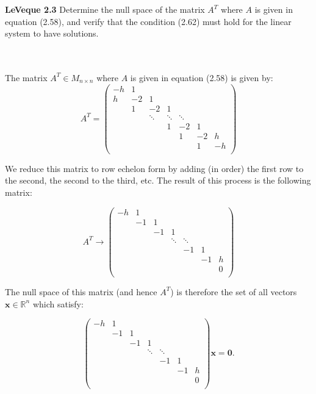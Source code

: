 \textbf{LeVeque 2.3}
Determine the null space of the matrix $A^T$ where $A$ is given in equation (2.58), and verify that the condition (2.62)
must hold for the linear system to have solutions.

\begin{solution}\ \\\\
    The matrix $A^T \in M_{n \times n}$ where $A$ is given in equation (2.58) is given by:
    \[
    A^T = \begin{pmatrix} 
        -h &       1 \\
         h &      -2 & 1 \\
           &       1 & -2 & 1 \\
           &         & \ddots & \ddots & \ddots \\
           &         &        & 1      & -2 & 1 \\
           &         &        &        & 1  & -2 & h \\
           &         &        &        &    & 1  & -h \\
    \end{pmatrix}
    \]

    We reduce this matrix to row echelon form by adding (in order) the first row to the second, the second to the third,
    etc. The result of this process is the following matrix:
    
    \[
    A^T \rightarrow \begin{pmatrix} 
        -h &       1 \\
           &      -1 & 1 \\
           &         & -1     & 1 \\
           &         &        & \ddots & \ddots \\
           &         &        &        & -1 & 1 \\
           &         &        &        &    & -1 & h \\
           &         &        &        &    &    & 0 \\
    \end{pmatrix}
    \]

    The null space of this matrix (and hence $A^T$) is therefore the set of all vectors $\textbf{x} \in \mathbb{R}^n$ 
    which satisfy:

    \[
    \begin{pmatrix} 
        -h &       1 \\
           &      -1 & 1 \\
           &         & -1     & 1 \\
           &         &        & \ddots & \ddots \\
           &         &        &        & -1 & 1 \\
           &         &        &        &    & -1 & h \\
           &         &        &        &    &    & 0 \\
    \end{pmatrix} \textbf{x} = \textbf{0}.
    \]


\end{solution}
